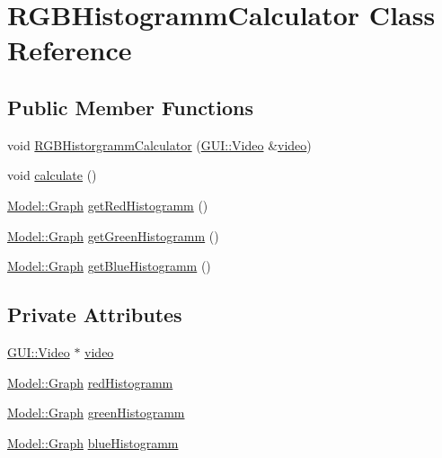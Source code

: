 \hypertarget{classUtility_1_1RGBHistogrammCalculator}{}\section{R\+G\+B\+Histogramm\+Calculator Class Reference}
\label{classUtility_1_1RGBHistogrammCalculator}
\subsection*{Public Member Functions}
\begin{DoxyCompactItemize}
\item 
void \hyperlink{classUtility_1_1RGBHistogrammCalculator_a32be12d183ceeb79d23d0a68deb944af}{R\+G\+B\+Historgramm\+Calculator} (\hyperlink{classGUI_1_1Video}{G\+U\+I\+::\+Video} \&\hyperlink{classUtility_1_1RGBHistogrammCalculator_a1c4d4daa00ecea5e8390244e057da0df}{video})
\item 
void \hyperlink{classUtility_1_1RGBHistogrammCalculator_afe1d8348c24e6589bc7c0b3f689316a7}{calculate} ()
\item 
\hyperlink{classModel_1_1Graph}{Model\+::\+Graph} \hyperlink{classUtility_1_1RGBHistogrammCalculator_a11345d1b2b32275950a10525c1e0e9d1}{get\+Red\+Histogramm} ()
\item 
\hyperlink{classModel_1_1Graph}{Model\+::\+Graph} \hyperlink{classUtility_1_1RGBHistogrammCalculator_a84bbb0085709b08aef6f9f2a849dcf10}{get\+Green\+Histogramm} ()
\item 
\hyperlink{classModel_1_1Graph}{Model\+::\+Graph} \hyperlink{classUtility_1_1RGBHistogrammCalculator_a6bc6a7ac3d5da8080b9c5f146c0d4e8f}{get\+Blue\+Histogramm} ()
\end{DoxyCompactItemize}
\subsection*{Private Attributes}
\begin{DoxyCompactItemize}
\item 
\hyperlink{classGUI_1_1Video}{G\+U\+I\+::\+Video} $\ast$ \hyperlink{classUtility_1_1RGBHistogrammCalculator_a1c4d4daa00ecea5e8390244e057da0df}{video}
\item 
\hyperlink{classModel_1_1Graph}{Model\+::\+Graph} \hyperlink{classUtility_1_1RGBHistogrammCalculator_aa97931e4df108eb05943015eeb5c4961}{red\+Histogramm}
\item 
\hyperlink{classModel_1_1Graph}{Model\+::\+Graph} \hyperlink{classUtility_1_1RGBHistogrammCalculator_afcdffaec20699457ed4c8691fef6aee2}{green\+Histogramm}
\item 
\hyperlink{classModel_1_1Graph}{Model\+::\+Graph} \hyperlink{classUtility_1_1RGBHistogrammCalculator_a4628a3031291dd5bf8908eb4c18db6dd}{blue\+Histogramm}
\end{DoxyCompactItemize}


